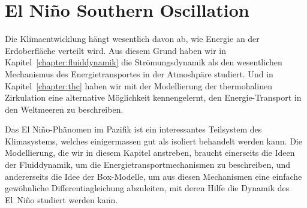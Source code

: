 %
%
%
\chapter{El Niño Southern Oscillation\label{chapter:elnino}}
Die Klimaentwicklung hängt wesentlich davon ab, wie Energie an der
Erdoberfläche verteilt wird.
Aus diesem Grund haben wir in Kapitel~\ref{chapter:fluiddynamik}
die Strömungsdynamik als den wesentlichen Mechanismus des 
Energietransportes in der Atmoshpäre studiert.
Und in Kapitel~\ref{chapter:thc} haben wir mit der Modellierung der
thermohalinen Zirkulation eine alternative Möglichkeit kennengelernt,
den Energie-Transport in den Weltmeeren zu beschreiben.

Das El Niño-Phänomen im Pazifik ist ein interessantes Teilsystem des
Klimasystems, welches einigermassen gut als isoliert behandelt werden kann.
Die Modellierung, die wir in diesem Kapitel anstreben, braucht
einerseits die Ideen der Fluiddynamik, um die Energietransportmechanismen
zu beschreiben, und andererseits die Idee der Box-Modelle, um aus diesen
Mechanismen eine einfache gewöhnliche Differentiagleichung abzuleiten,
mit deren Hilfe die Dynamik des El~Niño studiert werden kann.






